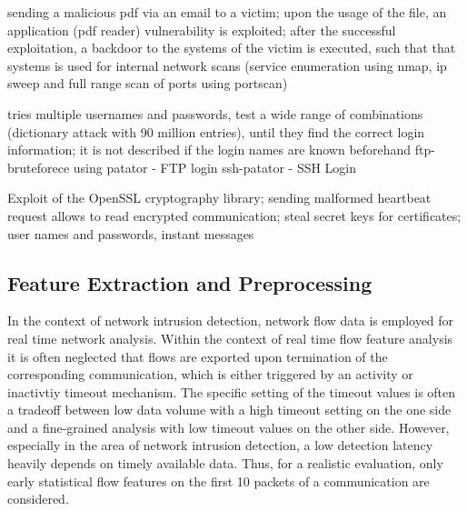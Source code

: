 \documentclass[../../main.tex]{subfiles}
\begin{document}

sending a malicious pdf via an email to a victim; upon the usage of the file, an application (pdf reader) vulnerability is exploited; after the successful exploitation, a backdoor to the systems of the victim is executed, such that that systems is used for internal network scans (service enumeration using nmap, ip sweep and full range scan of ports using portscan)

tries multiple usernames and passwords, test a wide range of combinations (dictionary attack with 90 million entries), until they find the correct login information; it is not described if the login names are known beforehand
ftp-bruteforece using patator - FTP login
ssh-patator - SSH Login






Exploit of the OpenSSL cryptography library; sending malformed heartbeat request
allows to read encrypted communication; steal secret keys for certificates; user names and passwords, instant messages 




\subsection{Feature Extraction and Preprocessing}

In the context of network intrusion detection, network flow data is employed for real time network analysis. Within the context of real time flow feature analysis it is often neglected that flows are exported upon termination of the corresponding communication, which is either triggered by an activity or inactivtiy timeout mechanism. The specific setting of the timeout values is often a tradeoff between low data volume with a high timeout setting on the one side and a fine-grained analysis with low timeout values on the other side. However, especially in the area of network intrusion detection, a low detection latency heavily depends on timely available data. Thus, for a realistic evaluation, only early statistical flow features on the first 10 packets of a communication are considered. 
\end{document}
